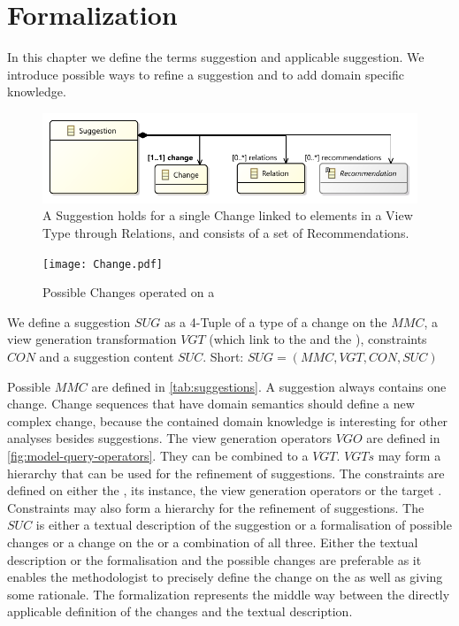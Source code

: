 \section{Formalization}
\label{sec:Formalization}
In this chapter we define the terms suggestion and applicable suggestion. We introduce possible ways to refine a suggestion and to add domain specific knowledge.

\begin{figure}
    \centering
    \includegraphics[width=\columnwidth]{images/Suggestion.pdf}
    \caption{A \textsf{Suggestion} holds for a single \textsf{Change} linked to elements in a View Type through \textsf{Relation}s, and consists of a set of \textsf{Recommendation}s.}
    \label{fig:Suggestion}
\end{figure}

\begin{figure}
    \centering
    \texttt{[image: Change.pdf]}
    \caption{Possible \textsf{Change}s operated on a \metamodel {}}
    \label{fig:Change}
\end{figure}


\begin{definition}[Suggestion]\label{def:suggestion}
We define a suggestion $SUG$ as a 4-Tuple of a type of a change on the \metamodel $MMC$, a view generation transformation $VGT$ (which link to the \metamodel and the \viewtype),  constraints $CON$ and a suggestion content $SUC$. Short: $SUG = (MMC, VGT, CON, SUC)$
\end{definition}
Possible $MMC$ are defined in \cref{tab:suggestions}. A suggestion always contains one change. Change sequences that have domain semantics should define a new complex change, because the contained domain knowledge is interesting for other analyses besides suggestions. The view generation operators $VGO$ are defined in \cref{fig:model-query-operators}. They can be combined to a $VGT$. $VGTs$ may form a hierarchy that can be used for the refinement of suggestions. The constraints are defined on either the \metamodel, its instance, the view generation operators or the target \metamodel. Constraints may also form a hierarchy for the refinement of suggestions. The $SUC$ is either a textual description of the suggestion or a formalisation of possible changes or a change on the \viewtype or a combination of all three. Either the textual description or the formalisation and the possible changes are preferable as it enables the methodologist to precisely define the change on the \viewtype \metamodel as well as giving some rationale. The formalization represents the middle way between the directly applicable definition of the changes and the textual description.

